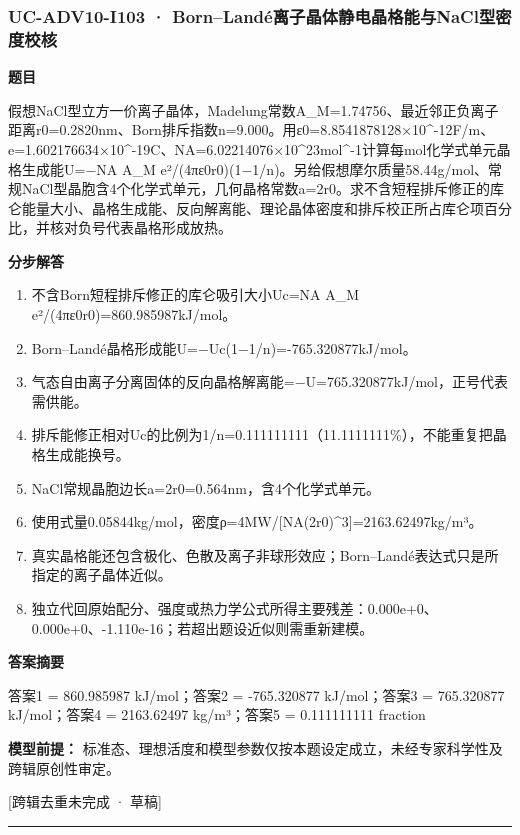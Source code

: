\documentclass[UTF8,11pt,a4paper]{ctexart}
\begin{document}
\subsubsection*{UC-ADV10-I103 · Born–Landé离子晶体静电晶格能与NaCl型密度校核}
\noindent\textbf{题目}\par
假想NaCl型立方一价离子晶体，Madelung常数A\_M=1.74756、最近邻正负离子距离r0=0.2820nm、Born排斥指数n=9.000。用ε0=8.8541878128×10\textasciicircum{}-12F/m、e=1.602176634×10\textasciicircum{}-19C、NA=6.02214076×10\textasciicircum{}23mol\textasciicircum{}-1计算每mol化学式单元晶格生成能U=−NA A\_M e²/(4πε0r0)(1−1/n)。另给假想摩尔质量58.44g/mol、常规NaCl型晶胞含4个化学式单元，几何晶格常数a=2r0。求不含短程排斥修正的库仑能量大小、晶格生成能、反向解离能、理论晶体密度和排斥校正所占库仑项百分比，并核对负号代表晶格形成放热。\par
\medskip\noindent\textbf{分步解答}
\begin{enumerate}
\item 不含Born短程排斥修正的库仑吸引大小Uc=NA A\_M e²/(4πε0r0)=860.985987kJ/mol。
\item Born–Landé晶格形成能U=−Uc(1−1/n)=-765.320877kJ/mol。
\item 气态自由离子分离固体的反向晶格解离能=−U=765.320877kJ/mol，正号代表需供能。
\item 排斥能修正相对Uc的比例为1/n=0.111111111（11.1111111\%），不能重复把晶格生成能换号。
\item NaCl常规晶胞边长a=2r0=0.564nm，含4个化学式单元。
\item 使用式量0.05844kg/mol，密度ρ=4MW/[NA(2r0)\textasciicircum{}3]=2163.62497kg/m³。
\item 真实晶格能还包含极化、色散及离子非球形效应；Born–Landé表达式只是所指定的离子晶体近似。
\item 独立代回原始配分、强度或热力学公式所得主要残差：0.000e+0、0.000e+0、-1.110e-16；若超出题设近似则需重新建模。
\end{enumerate}
\noindent\textbf{答案摘要}\par
答案1 = 860.985987 kJ/mol；答案2 = -765.320877 kJ/mol；答案3 = 765.320877 kJ/mol；答案4 = 2163.62497 kg/m³；答案5 = 0.111111111 fraction\par
\noindent\textbf{模型前提：}
标准态、理想活度和模型参数仅按本题设定成立，未经专家科学性及跨辑原创性审定。\par
\noindent\textcolor{red!65!black}{[跨辑去重未完成 · 草稿]} \par
\medskip\hrule\medskip
{}
\end{document}
